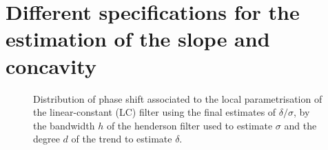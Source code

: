 \documentclass[
]{article}
\newcommand\1{\mathds{1}}
\begin{document}
\section{Different specifications for the estimation of the slope and
concavity}\label{different-specifications-for-the-estimation-of-the-slope-and-concavity}

\begin{figure}

\caption{\label{fig-graphs-lc-deg-final}Distribution of phase shift
associated to the local parametrisation of the linear-constant (LC)
filter using the final estimates of \(\delta/\sigma\), by the bandwidth
\(h\) of the henderson filter used to estimate \(\sigma\) and the degree
\(d\) of the trend to estimate \(\delta\).}


\end{figure}%
\end{document}
